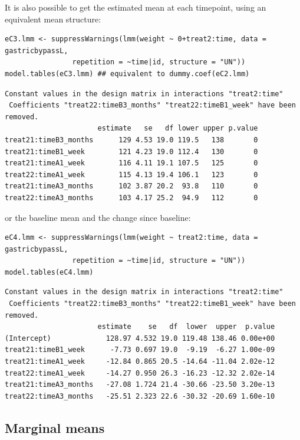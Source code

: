 \documentclass[12pt]{article}
\begin{document}
It is also possible to get the estimated mean at each timepoint, using
an equivalent mean structure:
\lstset{language=r,label= ,caption= ,captionpos=b,numbers=none}
\begin{lstlisting}
eC3.lmm <- suppressWarnings(lmm(weight ~ 0+treat2:time, data = gastricbypassL,
				repetition = ~time|id, structure = "UN"))
model.tables(eC3.lmm) ## equivalent to dummy.coef(eC2.lmm)
\end{lstlisting}

\begin{verbatim}
Constant values in the design matrix in interactions "treat2:time"
 Coefficients "treat22:timeB3_months" "treat22:timeB1_week" have been removed.
                      estimate   se   df lower upper p.value
treat21:timeB3_months      129 4.53 19.0 119.5   138       0
treat21:timeB1_week        121 4.23 19.0 112.4   130       0
treat21:timeA1_week        116 4.11 19.1 107.5   125       0
treat22:timeA1_week        115 4.13 19.4 106.1   123       0
treat21:timeA3_months      102 3.87 20.2  93.8   110       0
treat22:timeA3_months      103 4.17 25.2  94.9   112       0
\end{verbatim}


or the baseline mean and the change since baseline:
\lstset{language=r,label= ,caption= ,captionpos=b,numbers=none}
\begin{lstlisting}
eC4.lmm <- suppressWarnings(lmm(weight ~ treat2:time, data = gastricbypassL,
				repetition = ~time|id, structure = "UN"))
model.tables(eC4.lmm)
\end{lstlisting}

\begin{verbatim}
Constant values in the design matrix in interactions "treat2:time"
 Coefficients "treat22:timeB3_months" "treat22:timeB1_week" have been removed.
                      estimate    se   df  lower  upper  p.value
(Intercept)             128.97 4.532 19.0 119.48 138.46 0.00e+00
treat21:timeB1_week      -7.73 0.697 19.0  -9.19  -6.27 1.00e-09
treat21:timeA1_week     -12.84 0.865 20.5 -14.64 -11.04 2.02e-12
treat22:timeA1_week     -14.27 0.950 26.3 -16.23 -12.32 2.02e-14
treat21:timeA3_months   -27.08 1.724 21.4 -30.66 -23.50 3.20e-13
treat22:timeA3_months   -25.51 2.323 22.6 -30.32 -20.69 1.60e-10
\end{verbatim}

\subsection{Marginal means}
\label{sec:org20a708c}
\end{document}
